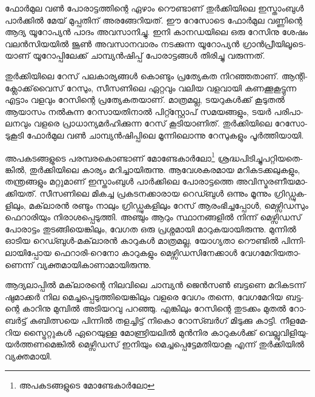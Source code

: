\vskip 2pt

­ഫോര്‍­മുല വണ്‍ പോ­രാ­ട്ട­ത്തി­ന്റെ ഏഴാം റൌ­ണ്ടാ­ണ് തുര്‍­ക്കി­യി­ലെ ഇസ്താം­ബുള്‍ പാര്‍­ക്കില്‍ മേ­യ് മു­പ്പ­തി­ന് 
അര­ങ്ങേ­റി­യ­ത്. ഈ റേ­സോ­ടെ ഫോര്‍­മുല വണ്ണി­ന്റെ ആദ്യ യൂ­റോ­പ്യന്‍ പാ­ദം അവ­സാ­നി­ച്ചു. ഇനി കാ­ന­ഡ­യി­ലെ 
ഒരു റേ­സി­നു ശേ­ഷം വലന്‍­സി­യ­യില്‍ ജൂണ്‍ അവ­സാ­ന­വാ­രം നട­ക്കു­ന്ന യൂ­റോ­പ്യന്‍ ഗ്രാന്‍­പ്രീ­യി­ലൂ­ടെ­യാ­ണ് 
യൂ­റോ­പ്പി­ലേ­ക്ക് ചാ­മ്പ്യന്‍­ഷി­പ്പ് പോ­രാ­ട്ട­ങ്ങള്‍ തി­രി­ച്ചു വരു­ന്ന­ത്.

­തുര്‍­ക്കി­യി­ലെ റേ­സ് പല­കാ­ര്യ­ങ്ങള്‍ കൊ­ണ്ടും പ്ര­ത്യേ­കത നി­റ­ഞ്ഞ­താ­ണ്. ആന്റി­ക്ലോ­ക്ക്‌­വൈ­സ് റേ­സും, സീ­സ­ണി­ലെ 
ഏറ്റ­വും വലിയ വള­വാ­യി കണ­ക്കൂ­കൂ­ട്ടു­ന്ന എട്ടാം വള­വും റേ­സി­ന്റെ പ്ര­ത്യേ­ക­ത­യാ­ണ്. മാ­ത്ര­മ­ല്ല, ടയ­റു­കള്‍­ക്ക് കൂ­ടു­തല്‍ 
ആയാ­സം നല്‍­കു­ന്ന റേ­സാ­യ­തി­നാല്‍ പി­റ്റ്സ്റ്റോ­പ് സമ­യ­ങ്ങ­ളും, ടയര്‍ പരി­പാ­ല­ന­വും വള­രെ പ്രാ­ധാ­ന്യ­മര്‍­ഹി­ക്കു­ന്ന 
റേ­സ് കൂ­ടി­യാ­ണി­ത്. തുര്‍­ക്കി­യി­ലെ റേ­സോ­ടു­കൂ­ടി ­ഫോര്‍­മുല വണ്‍ ചാ­മ്പ്യന്‍­ഷി­പ്പി­ലെ മൂ­ന്നി­ലൊ­ന്നു റേ­സു­ക­ളും പൂര്‍­ത്തി­യാ­യി­.

അ­പ­ക­ട­ങ്ങ­ളു­ടെ പര­മ്പ­ര­കൊ­ണ്ടാ­ണ് മോണ്ടേകാര്‍ലോ\footnote{അപകടങ്ങളുടെ മോണ്ടേകാര്‍ലോ} ശ്ര­ദ്ധ­പി­ടി­ച്ചു­പ­റ്റി­യ­തെ­ങ്കില്‍, തുര്‍­ക്കി­യി­ലെ കാ­ര്യം മറി­ച്ചാ­യി­രു­ന്നു. 
ആവേ­ശ­ക­ര­മായ മറി­ക­ട­ക്ക­ലു­ക­ളും, തന്ത്ര­ങ്ങ­ളും മറ്റു­മാ­ണ് ഇസ്താം­ബുള്‍ പാര്‍­ക്കി­ലെ പോ­രാ­ട്ട­ത്തെ അവി­സ്മ­ര­ണീ­യ­മാ­ക്കി­യ­ത്. 
സീ­സ­ണി­ലെ മി­ക­ച്ച പ്ര­ക­ട­ന­ക്കാ­രായ ­റെ­ഡ്ബുള്‍ ഒന്നും മൂ­ന്നും ഗ്രി­ഡ്ഡു­ക­ളി­ലും, മക്‌­ലാ­രന്‍ രണ്ടും നാ­ലും ഗ്രി­ഡ്ഡു­ക­ളി­ലും റേ­സ് 
ആരം­ഭി­ച്ച­പ്പോള്‍, മെ­ഴ്സി­ഡ­സും ഫെ­റാ­രി­യും നി­രാ­ശ­പ്പെ­ടു­ത്തി. അഞ്ചും ആറും സ്ഥാ­ന­ങ്ങ­ളില്‍ നി­ന്ന് ­മെ­ഴ്സി­ഡ­സ് പോ­രാ­ട്ടം 
തു­ട­ങ്ങി­യെ­ങ്കി­ലും, വേ­ഗത ഒരു പ്ര­ശ്ന­മാ­യി മാ­റു­ക­യാ­യി­രു­ന്നു. മു­ന്നില്‍ ഓടിയ റെ­ഡ്ബുള്‍-മക്‌­ലാ­രന്‍ കാ­റു­കള്‍ മാ­ത്ര­മ­ല്ല, 
യോ­ഗ്യ­താ റൌ­ണ്ടില്‍ പി­ന്നി­ലാ­യി­പ്പോയ ഫെ­റാ­രി-റെ­നോ കാ­റു­ക­ളും മെ­ഴ്സി­ഡ­സി­നേ­ക്കാള്‍ വേ­ഗ­മേ­റി­യ­താ­ണെ­ന്ന് 
വ്യ­ക്ത­മാ­യി­കാ­ണാ­മാ­യി­രു­ന്നു­.

ആ­ദ്യ­ലാ­പ്പില്‍ മക്‌­ലാ­ര­ന്റെ നി­ല­വി­ലെ ചാ­മ്പ്യന്‍ ജെന്‍­സണ്‍ ബട്ട­ണെ മറി­ക­ട­ന്ന് ഷു­മാ­ക്കര്‍ നില മെ­ച്ച­പ്പെ­ടു­ത്തി­യെ­ങ്കി­ലും 
വള­രെ വേ­ഗം തന്നെ, വേ­ഗ­മേ­റിയ ബട്ട­ന്റെ കാ­റി­നു മു­മ്പില്‍ അടി­യ­റ­വു പറ­ഞ്ഞു. എങ്കി­ലും റേ­സി­ന്റെ തു­ട­ക്കം മു­തല്‍ റോ­ബര്‍­ട്ട് 
കു­ബി­ത്സ­യെ പി­ന്നില്‍ തള­ച്ചി­ട്ട് ­നി­കൊ റോ­സ്ബര്‍­ഗ് മി­ടു­ക്കു കാ­ട്ടി. നീ­ള­മേ­റിയ സ്ട്രൈ­റ്റു­കള്‍ ഏറെ­യു­ള്ള മോ­ണ്ട്രി­യ­ലില്‍ 
മുന്‍­നിര കാ­റു­കള്‍­ക്ക് വെ­ല്ലു­വി­ളി­യു­യര്‍­ത്ത­ണ­മെ­ങ്കില്‍ മെ­ഴ്സി­ഡ­സ് ഇനി­യും മെ­ച്ച­പ്പെ­ട്ടേ­മ­തി­യാ­കൂ എന്ന് തുര്‍­ക്കി­യില്‍ 
വ്യ­ക്ത­മാ­യി­.

